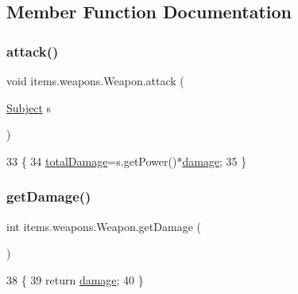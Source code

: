 \subsection{Member Function Documentation}
\mbox{\label{classitems_1_1weapons_1_1_weapon_a2d097d82844c1426c09cf26d2f5a1b94}} 
\subsubsection{\texorpdfstring{attack()}{attack()}}
{\footnotesize\ttfamily void items.\+weapons.\+Weapon.\+attack (\begin{DoxyParamCaption}\item[{\mbox{\hyperlink{classentities_1_1_subject}{Subject}}}]{s }\end{DoxyParamCaption})\hspace{0.3cm}{\ttfamily [inline]}}


\begin{DoxyCode}
33                                  \{
34         \mbox{\hyperlink{classitems_1_1weapons_1_1_weapon_afce1cb3b61716a4880f125ac3bd2856b}{totalDamage}}=s.getPower()*\mbox{\hyperlink{classitems_1_1weapons_1_1_weapon_aa84d0aca66daedb3adb9209b6f2846a3}{damage}};
35     \}
\end{DoxyCode}
\mbox{\label{classitems_1_1weapons_1_1_weapon_ac77d8b8350bf90ab04a2f8869f73358c}} 
\subsubsection{\texorpdfstring{get\+Damage()}{getDamage()}}
{\footnotesize\ttfamily int items.\+weapons.\+Weapon.\+get\+Damage (\begin{DoxyParamCaption}{ }\end{DoxyParamCaption})\hspace{0.3cm}{\ttfamily [inline]}}


\begin{DoxyCode}
38                            \{
39         \textcolor{keywordflow}{return} \mbox{\hyperlink{classitems_1_1weapons_1_1_weapon_aa84d0aca66daedb3adb9209b6f2846a3}{damage}};
40     \}
\end{DoxyCode}
\mbox{\label{classitems_1_1weapons_1_1_weapon_acff36703dc4c95e39a445288d3899980}} 
